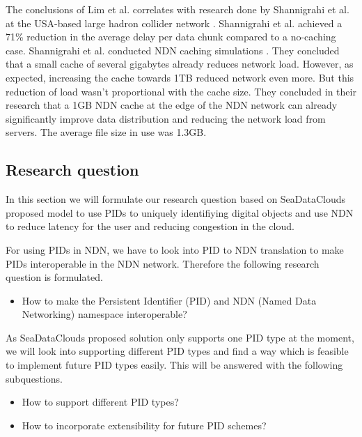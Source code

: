 The conclusions of Lim et al. correlates with research done by Shannigrahi et al. at the USA-based large hadron collider network \cite{shannigrahi2015named}. Shannigrahi et al. achieved a 71\% reduction in the average delay per data chunk compared to a no-caching case. Shannigrahi et al. conducted NDN caching simulations \cite{shannigrahi2017request}. They concluded that a small cache of several gigabytes already reduces network load. However, as expected, increasing the cache towards 1TB reduced network even more. But this reduction of load wasn't proportional with the cache size. They concluded in their research that a 1GB NDN cache at the edge of the NDN network can already significantly improve data distribution and reducing the network load from servers. The average file size in use was 1.3GB.




\subsection{Research question}
In this section we will formulate our research question based on SeaDataClouds proposed model to use PIDs to uniquely identifiying digital objects and use NDN to reduce latency for the user and reducing congestion in the cloud.

For using PIDs in NDN, we have to look into PID to NDN translation to make PIDs interoperable in the NDN network. Therefore the following research question is formulated.

\begin{itemize}
	\item How to make the Persistent Identifier (PID) and NDN (Named Data Networking) namespace interoperable?
\end{itemize}

As SeaDataClouds proposed solution only supports one PID type at the moment, we will look into supporting different PID types and find a way which is feasible to implement future PID types easily. This will be answered with the following subquestions.
\begin{itemize}
    \begin{itemize}
	    \item How to support different PID types?
	    \item How to incorporate extensibility for future PID schemes?
	 \end{itemize}   
\end{itemize}

